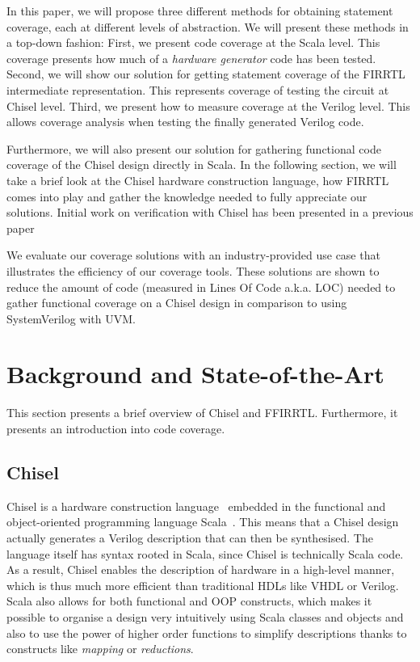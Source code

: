 \documentclass[runningheads]{llncs}
\begin{document}
In this paper, we will propose three different methods for obtaining statement coverage, each at different levels of abstraction. We will present these methods in a top-down fashion: First, we present code coverage at the Scala level. This coverage presents how much of a \emph{hardware generator} code has been tested. 
Second, we will show our solution for getting statement coverage of the FIRRTL intermediate representation. This represents coverage of testing the circuit at Chisel level. Third, we present how to measure coverage at the Verilog level. This allows coverage analysis when testing the finally generated Verilog code.

Furthermore, we will also present our solution for gathering functional code coverage of the Chisel design directly in Scala. In the following section, we will take a brief look at the Chisel hardware construction language, how FIRRTL comes into play and gather the knowledge needed to fully appreciate our solutions. Initial work on verification with Chisel has been presented in a previous paper~\cite{blind} %

We evaluate our coverage solutions with an industry-provided use case that illustrates the efficiency of our coverage tools. These solutions are shown to reduce the amount of code (measured in Lines Of Code a.k.a. LOC) needed to gather functional coverage on a Chisel design in comparison to using SystemVerilog with UVM.

\section{Background and State-of-the-Art}
\label{sec:background}
This section presents a brief overview of Chisel and FFIRRTL. Furthermore, it presents an introduction into code coverage.

\subsection{Chisel}
Chisel is a hardware construction language~\cite{chisel:dac2012, chisel:book} embedded in the functional and object-oriented programming language Scala~\cite{Scala}. This means that a Chisel design actually generates a Verilog description that can then be synthesised. The language itself has syntax rooted in Scala, since Chisel is technically Scala code. As a result, Chisel enables the description of hardware in a high-level manner, which is thus much more efficient than traditional HDLs like VHDL or Verilog. Scala also allows for both functional and OOP constructs, which makes it possible to organise a design very intuitively using Scala classes and objects and also to use the power of higher order functions to simplify descriptions thanks to constructs like \textit{mapping} or \textit{reductions}.
\end{document}

